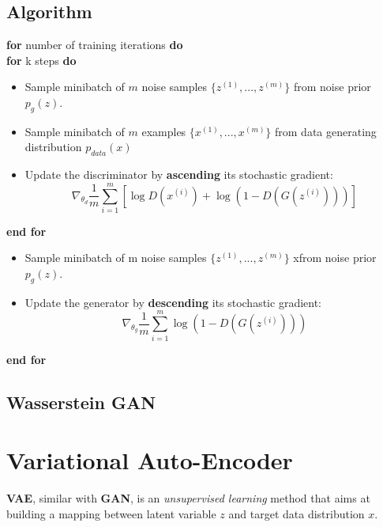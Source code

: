 \documentclass[a4paper, 12pt]{book} %
\begin{document}
\subsection{Algorithm}
\textbf{for} number of training iterations \textbf{do}\\
\indent \textbf{for} k steps \textbf{do} 
\begin{itemize}[leftmargin=+0.5in]
	\item Sample minibatch of $m$ noise samples $\{z^{(1)},..., z^{(m)}\}$ from noise prior $p_g{(z)}$.
	\item Sample minibatch of $m$ examples $\{x^{(1)},..., x^{(m)}\}$ from data generating distribution $p_{data}{(x)}$
	\item Update the discriminator by \textbf{ascending} its stochastic gradient:
	$$\nabla_{\theta_d}{\frac{1}{m}\sum_{i=1}^{m}{ [\log{D(x^{(i)})}+\log{(1-D(G(z^{(i)})))}]}}$$
\end{itemize}
\indent\indent \textbf{end for} 
\begin{itemize}
	\item Sample minibatch of m noise samples $\{z^{(1)},..., z^{(m)}\}$ xfrom noise prior $p_g{(z)}$.
	\item Update the generator by \textbf{descending} its stochastic gradient:
		$$\nabla_{\theta_g}{\frac{1}{m}\sum_{i=1}^{m}{\log{(1-D(G(z^{(i)})))}}}$$
\end{itemize}
\textbf{end for}
\subsection{Wasserstein GAN}

\section{Variational Auto-Encoder}
\textbf{VAE}, similar with \textbf{GAN}, is an \emph{unsupervised learning} method that aims at building a mapping between latent variable $z$ and target data distribution $x$. 
\end{document}
